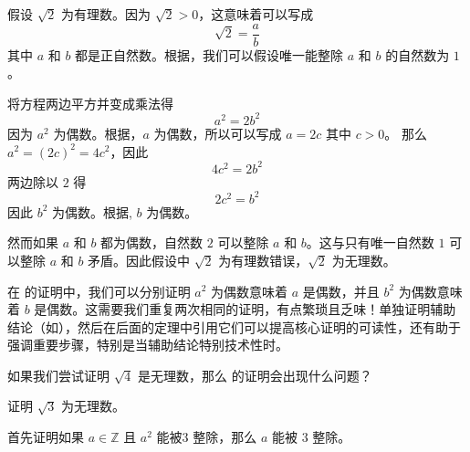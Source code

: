 \begin{cproof}
假设 $\sqrt{2}$ 为有理数。因为 $\sqrt{2}>0$，这意味着可以写成
\[ \sqrt{2} = \frac{a}{b} \]
其中 $a$ 和 $b$ 都是正自然数。根据，我们可以假设唯一能整除 $a$ 和 $b$ 的自然数为 $1$。

将方程两边平方并变成乘法得
\[ a^2=2b^2 \]
因为 $a^2$ 为偶数。根据，$a$ 为偶数，所以可以写成 $a=2c$ 其中 $c > 0$。 那么 $a^2=(2c)^2=4c^2$，因此
\[ 4c^2=2b^2 \]
两边除以 $2$ 得
\[ 2c^2 = b^2 \]
因此 $b^2$ 为偶数。根据, $b$ 为偶数。

然而如果 $a$ 和 $b$ 都为偶数，自然数 $2$ 可以整除 $a$ 和 $b$。这与只有唯一自然数 $1$ 可以整除 $a$ 和 $b$ 矛盾。因此假设中 $\sqrt{2}$ 为有理数错误，$\sqrt{2}$ 为无理数。
\end{cproof}

\begin{writingtip}
在  的证明中，我们可以分别证明 $a^2$ 为偶数意味着 $a$ 是偶数，并且 $b^2$ 为偶数意味着 $b$ 是偶数。这需要我们重复两次相同的证明，有点繁琐且乏味！单独证明辅助结论（如），然后在后面的定理中引用它们可以提高核心证明的可读性，还有助于强调重要步骤，特别是当辅助结论特别技术性时。
\end{writingtip}

\begin{exercise}
如果我们尝试证明 $\sqrt{4}$ 是无理数，那么  的证明会出现什么问题？
\end{exercise}

\begin{exercise}
\label{exSquareRootThreeIsIrrational}
证明 $\sqrt{3}$ 为无理数。
\begin{backhint}
首先证明如果 $a \in \mathbb{Z}$ 且 $a^2$ 能被$3$ 整除，那么 $a$ 能被 $3$ 整除。
\end{backhint}
\end{exercise}


